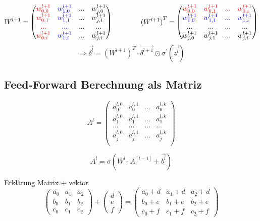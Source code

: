 \documentclass{article}
\begin{document}
\[ W^{l+1} = \begin{pmatrix}
    \textcolor{red}{w_{0,0}^{l+1}} & \textcolor{blue}{w_{1,0}^{l+1}} & ... & w_{j,0}^{l+1} \\
    \textcolor{red}{w_{0,1}^{l+1}} & \textcolor{blue}{w_{1,1}^{l+1}} & ... & w_{j,1}^{l+1} \\
    \textcolor{red}{...} & \textcolor{blue}{...} & ... & ... \\
    \textcolor{red}{w_{0,i}^{l+1}} & \textcolor{blue}{w_{1,i}^{l+1}} & ... & w_{j,i}^{l+1}
\end{pmatrix} 
\kern 40pt
{(W^{l+1})}^T = \begin{pmatrix}
    \textcolor{red}{w_{0,0}^{l+1}} & \textcolor{red}{w_{0,1}^{l+1}} & \textcolor{red}{...} & \textcolor{red}{w_{0,i}^{l+1}} \\
    \textcolor{blue}{w_{1,0}^{l+1}} & \textcolor{blue}{w_{1,1}^{l+1}} & \textcolor{blue}{...} & \textcolor{blue}{w_{1,i}^{l+1}} \\
    ... & ... & ... & ... \\
    w_{j,0}^{l+1} & w_{j,1}^{l+1} & ... & w_{j,i}^{l+1} 
\end{pmatrix} \]
\[ \Rightarrow \vec{\delta^l} = {(W^{l+1})}^T \cdot \vec{\delta^{l+1}} \odot \sigma^{\prime}(\vec{z^l}) \]


 \subsection{Feed-Forward Berechnung als Matriz}

 \[ A^l = 
 \begin{pmatrix}
    a_0^{l,0} & a_0^{l,1} & ... & a_0^{l,k} \\
    a_1^{l,0} & a_1^{l,1} & ... & a_1^{l,k} \\
    ... & ... & ... & ... \\
    a_j^{l,0} & a_j^{l,1} & ... & a_j^{l,k} \\
 \end{pmatrix} \]



 \[ A^l = \sigma (W^l \cdot A^{[l-1]} + \vec{b^l}) \]

Erklärung Matrix $+$ vektor
 \[ \begin{pmatrix}
    a_0 & a_1 & a_2 \\
    b_0 & b_1 & b_2 \\
    c_0 & c_1 & c_2
 \end{pmatrix} 
 + \begin{pmatrix}
    d \\ e \\ f
 \end{pmatrix} 
 = \begin{pmatrix}
    a_0 + d & a_1 + d & a_2 + d\\
    b_0 + e & b_1 + e & b_2 + e \\
    c_0 + f & c_1 + f & c_2 + f
 \end{pmatrix}\]
\end{document}
